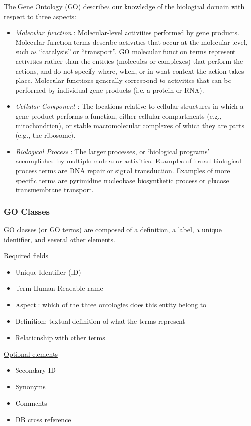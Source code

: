 \documentclass[11pt]{article}
\begin{document}
The Gene Ontology (GO) describes our knowledge of the biological domain with respect to three
aspects:
\begin{itemize}
\item \emph{Molecular function} : Molecular-level activities performed by gene products. Molecular
function terms describe activities that occur at the molecular level, such as “catalysis” or
“transport”. GO molecular function terms represent activities rather than the entities
(molecules or complexes) that perform the actions, and do not specify where, when, or in
what context the action takes place. Molecular functions generally correspond to activities
that can be performed by individual gene products (i.e. a protein or RNA).

\item \emph{Cellular Component} : The locations relative to cellular structures in which a gene product
performs a function, either cellular compartments (e.g., mitochondrion), or stable
macromolecular complexes of which they are parts (e.g., the ribosome).

\item \emph{Biological Process} : The larger processes, or ‘biological programs’ accomplished by
multiple molecular activities. Examples of broad biological process terms are DNA repair or
signal transduction. Examples of more specific terms are pyrimidine nucleobase biosynthetic
process or glucose transmembrane transport.
\end{itemize}

\subsubsection{GO Classes}
\label{sec:org6a1eee4}
GO classes (or GO terms) are composed of a definition, a label, a unique identifier, and
several other elements.

\uline{Required fields}\\
\begin{itemize}
\item Unique Identifier (ID)
\item Term Human Readable name
\item Aspect : which of the three ontologies does this entity belong to
\item Definition: textual definition of what the terms represent
\item Relationship with other terms
\end{itemize}

\uline{Optional elements}\\
\begin{itemize}
\item Secondary ID
\item Synonyms
\item Comments
\item DB cross reference
\end{itemize}
\end{document}
